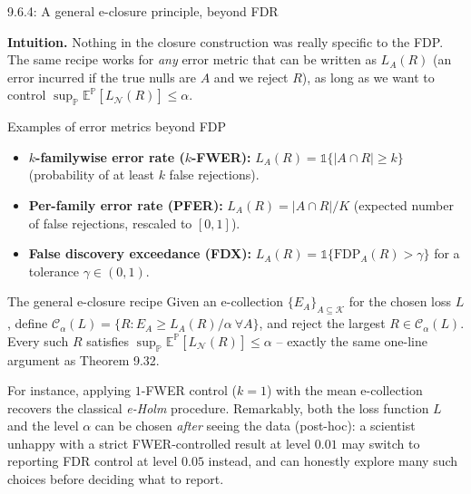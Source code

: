 \documentclass[aspectratio=169,10pt]{beamer}
\newcommand{\Kc}{\mathcal{K}}
\newcommand{\Nc}{\mathcal{N}}
\begin{document}
\begin{frame}[allowframebreaks]{9.6.4: A general e-closure principle, beyond FDR}

\textbf{Intuition.} Nothing in the closure construction was really specific to the FDP. The same recipe works for \emph{any} error metric that can be written as $L_A(R)$ (an error incurred if the true nulls are $A$ and we reject $R$), as long as we want to control $\sup_{\mathbb{P}} \mathbb{E}^{\mathbb{P}}[L_\Nc(R)] \le \alpha$.

\begin{block}{Examples of error metrics beyond FDP}
\begin{itemize}
\item \textbf{$k$-familywise error rate ($k$-FWER):} $L_A(R) = \mathbb{1}\{|A\cap R|\ge k\}$ (probability of at least $k$ false rejections).
\item \textbf{Per-family error rate (PFER):} $L_A(R) = |A\cap R|/K$ (expected number of false rejections, rescaled to $[0,1]$).
\item \textbf{False discovery exceedance (FDX):} $L_A(R) = \mathbb{1}\{\text{FDP}_A(R) > \gamma\}$ for a tolerance $\gamma\in(0,1)$.
\end{itemize}
\end{block}

\begin{block}{The general e-closure recipe}
Given an e-collection $\{E_A\}_{A\subseteq\Kc}$ for the chosen loss $L$, define $\mathcal{C}_\alpha(L) = \{R : E_A \ge L_A(R)/\alpha \ \forall A\}$, and reject the largest $R\in\mathcal{C}_\alpha(L)$. Every such $R$ satisfies $\sup_{\mathbb{P}}\mathbb{E}^{\mathbb{P}}[L_\Nc(R)]\le\alpha$ -- exactly the same one-line argument as Theorem 9.32.
\end{block}
For instance, applying $1$-FWER control ($k=1$) with the mean e-collection recovers the classical \emph{e-Holm} procedure. Remarkably, both the loss function $L$ and the level $\alpha$ can be chosen \emph{after} seeing the data (post-hoc): a scientist unhappy with a strict FWER-controlled result at level $0.01$ may switch to reporting FDR control at level $0.05$ instead, and can honestly explore many such choices before deciding what to report.

\end{frame}
\end{document}
